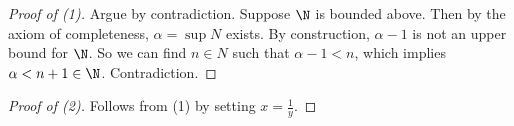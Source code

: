 \begin{proof}[Proof of (1)]
  Argue by contradiction. Suppose $\N$ is bounded above.
  Then by the axiom of completeness, $\alpha = \sup N$
  exists. By construction, $\alpha - 1$ is not an
  upper bound for  $\N$. So we can find  $n \in N$
  such that  $\alpha - 1 < n$, which implies
  $\alpha < n + 1 \in \N$. Contradiction.
\end{proof}

\begin{proof}[Proof of (2)]
  Follows from (1) by setting $x = \frac{1}{y}$.
\end{proof}
